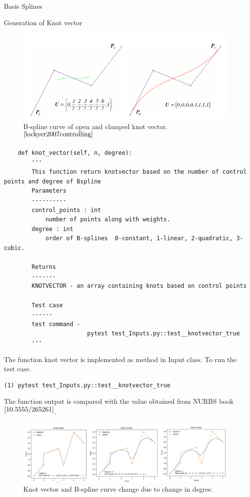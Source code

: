 \documentclass[a4paper,12pt,times]{article}
\begin{document}
\begin{section}{Basis Splines}
\begin{subsection}{Generation of Knot vector}
\begin{figure}[h!]
\centering
\includegraphics[width=0.75\linewidth]{knot_vector_clamped_unclamped.png}
\caption{B-spline curve of open and clamped knot vector.$^{\cite{lockyer2007controlling}}$}
\label{fig:B-spline curve of evenly space open clamped knot vector}
\end{figure}

\begin{lstlisting}
    def knot_vector(self, n, degree):
        '''
        This function return knotvector based on the number of control points and degree of Bspline
        Parameters
        ----------
        control_points : int
            number of points along with weights.
        degree : int
            order of B-splines  0-constant, 1-linear, 2-quadratic, 3-cubic.

        Returns
        -------
        KNOTVECTOR - an array containing knots based on control points

        Test case
        ------
        test command - 
                        pytest test_Inputs.py::test__knotvector_true
        '''
\end{lstlisting}

The function knot vector is implemented as method in Input class.
To run the test case. 

\begin{lstlisting}
(1) pytest test_Inputs.py::test__knotvector_true
\end{lstlisting}
The function output is compared with the value obtained from NURBS book $^{\cite{10.5555/265261}}$.


\begin{figure}[h!]
\centering
\includegraphics[width=\linewidth]{knot_vector_combined.png}
\caption{Knot vector and B-spline curve change due to change in degree.}
\label{fig:change in knot vector and B-spline curve due to change in degree}
\end{figure}


\end{subsection}
\end{section}
\end{document}
